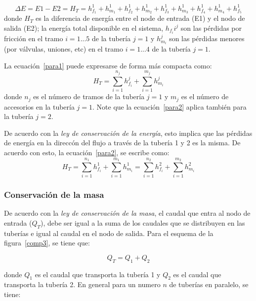 \documentclass[11pt, oneside]{article}
\begin{document}
\begin{equation}
\Delta E = E1-E2 = H_T = h_{f_1}^1 + h_{m_1}^1 + h_{f_2}^1 + h_{m_2}^1 + h_{f_3}^1 + h_{m_3}^1 + h_{f_4}^1 + h_{m_4}^1 + h_{f_5}^1
\label{para1}
\end{equation}
donde $H_T$ es la diferencia de energ\'ia entre el node de entrada (E1) y el nodo de salida (E2); la energ\'ia total disponible en el sistema, $h_{f_i}i^j$ son las p\'erdidas por fricci\'on en el tramo $i=1...5$ de la tuber\'ia $j=1$ y $h_{m_i}^j$ son las p\'erdidas menores (por v\'alvulas, uniones, etc) en el tramo $i=1...4$ de la tuber\'ia $j=1$.

La ecuaci\'on~\ref{para1} puede expresarse de forma m\'as compacta como:
\begin{equation}
H_T = \sum_{i=1}^{n_j} h_{f_i}^j + \sum_{i=1}^{m_j} h_{m_i}^j
\label{para2}
\end{equation}
donde $n_j$ es el n\'umero de tramos de la tuber\'ia $j=1$ y $m_j$ es el n\'umero de accesorios en la tuber\'ia $j=1$. Note que la ecuaci\'on~\ref{para2} aplica tambi\'en para la tuber\'ia $j=2$.

De acuerdo con la \emph{ley de conservaci\'on de la energ\'ia}, esto implica que las p\'erdidas de energ\'ia en la direcc\'on del flujo a trav\'es de la tuber\'ia 1 y 2 es la misma. De acuerdo con esto, la ecuaci\'on~\ref{para2}, se escribe como:
\begin{equation}
H_T = \sum_{i=1}^{n_1} h_{f_i}^1 + \sum_{i=1}^{m_1} h_{m_i}^1 = \sum_{i=1}^{n_2} h_{f_i}^2 + \sum_{i=1}^{m_2} h_{m_i}^2
\label{para3}
\end{equation}

\subsubsection*{Conservaci\'on de la masa}
De acuerdo con la \emph{ley de conservaci\'on de la masa}, el caudal que entra al nodo de entrada ($Q_T$), debe ser igual a la suma de los caudales que se distribuyen en las tuber\'ias e igual al caudal en el nodo de salida. Para el esquema de la figura~\ref{comp3}, se tiene que:

\begin{equation}
Q_T = Q_1 + Q_2
\label{para4}
\end{equation}

donde $Q_1$ es el caudal que transporta la tuber\'ia 1 y $Q_2$ es el caudal que transporta la tuber\'ia 2. En general para un numero $n$ de tuber\'ias en paralelo, se tiene:
\end{document}
